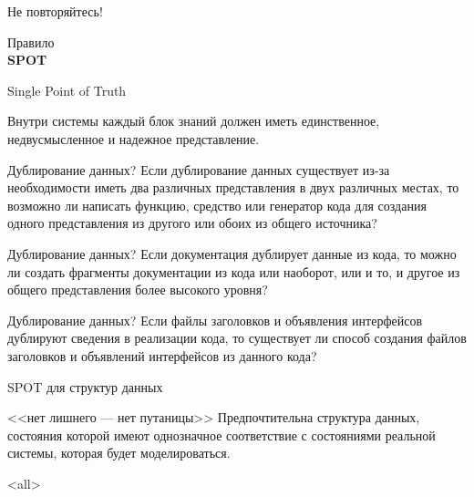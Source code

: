 \begin{frame}{Не повторяйтесь!}
	\begin{center}
	Правило\\
	{\Huge\bfseries SPOT}

	Single Point of Truth

	\end{center}
	\pause
	
	Внутри системы каждый блок знаний должен иметь единственное,  недвусмысленное и надежное представление.
\end{frame}

\begin{frame}{Дублирование данных?}
	Если дублирование данных существует из-за необходимости иметь два различных представления в 
	двух различных местах,  то возможно ли написать функцию,  средство или генератор кода для 
	создания одного представления из другого или обоих из общего источника?
\end{frame}

\begin{frame}{Дублирование данных?}
Если документация дублирует данные из кода,  то можно ли создать фрагменты документации 
из кода или наоборот,  или и то,  и другое из общего представления более высокого уровня?
\end{frame}

\begin{frame}{Дублирование данных?}
	Если файлы заголовков и объявления интерфейсов дублируют сведения в реализации кода,  
	то существует ли способ создания файлов заголовков и объявлений интерфейсов из данного кода?
\end{frame}

\begin{frame}{SPOT для структур данных}
	\begin{block}{<<нет лишнего — нет путаницы>>}
		Предпочтительна структура данных,  состояния которой имеют однозначное 
		соответствие с состояниями реальной системы,  которая будет моделироваться.
	\end{block}
\end{frame}

\mode<all>{}


